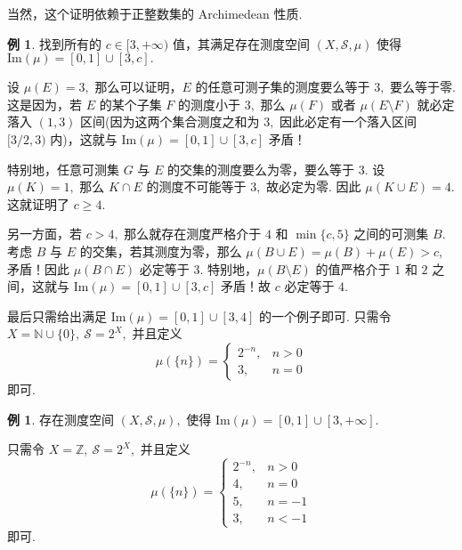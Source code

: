 \documentclass[12pt, a4paper, oneside]{book}
\numberwithin{figure}{section}
\theoremstyle{definition}
\newtheorem{example}[theorem]{例}
\begin{document}
当然，这个证明依赖于正整数集的 Archimedean 性质.

\begin{example}
    找到所有的 $c\in [3,+\infty)$ 值，其满足存在测度空间 $(X,\mathcal S,\mu)$ 使得 $\mathrm{Im}(\mu)=[0,1]\cup [3,c].$
\end{example}

设 $\mu(E)=3,$ 那么可以证明，$E$ 的任意可测子集的测度要么等于 $3,$ 要么等于零. 这是因为，若 $E$ 的某个子集 $F$ 的测度小于 $3,$ 那么 $\mu(F)$ 或者 $\mu(E\setminus F)$ 就必定落入 $(1,3)$ 区间(因为这两个集合测度之和为 $3,$ 因此必定有一个落入区间 $[3/2,3)$ 内)，这就与 $\mathrm{Im}(\mu)=[0,1]\cup [3,c]$ 矛盾！

特别地，任意可测集 $G$ 与 $E$ 的交集的测度要么为零，要么等于 $3.$ 设 $\mu(K)=1,$ 那么 $K\cap E$ 的测度不可能等于 $3,$ 故必定为零. 因此 $\mu(K\cup E)=4.$ 这就证明了 $c\geq 4.$

另一方面，若 $c>4,$ 那么就存在测度严格介于 $4$ 和 $\min\{c,5\}$ 之间的可测集 $B.$ 考虑 $B$ 与 $E$ 的交集，若其测度为零，那么 $\mu(B\cup E)=\mu(B)+\mu(E)>c,$ 矛盾！因此 $\mu(B\cap E)$ 必定等于 $3.$ 特别地，$\mu(B\setminus E)$ 的值严格介于 $1$ 和 $2$ 之间，这就与 $\mathrm{Im}(\mu)=[0,1]\cup[3,c]$ 矛盾！故 $c$ 必定等于 $4.$

最后只需给出满足 $\mathrm{Im}(\mu)=[0,1]\cup [3,4]$ 的一个例子即可. 只需令 $X=\mathbb N\cup\{0\},\ \mathcal S=2^{X},$ 并且定义
\begin{equation}
    \mu(\{n\}) = \begin{cases}
        2^{-n},&n>0\\
        3,&n= 0
    \end{cases}
\end{equation}
即可.

\begin{example}
    存在测度空间 $(X,\mathcal S,\mu),$ 使得 $\mathrm{Im}(\mu)=[0,1]\cup [3,+\infty].$
\end{example}
只需令 $X=\mathbb Z,\ \mathcal S=2^{X},$ 并且定义
\begin{equation}
    \mu(\{n\}) = \begin{cases}
        2^{-n},&n>0\\
        4,&n= 0\\
        5,&n=-1\\
        3,&n<-1
    \end{cases}
\end{equation}
即可.
\end{document}
